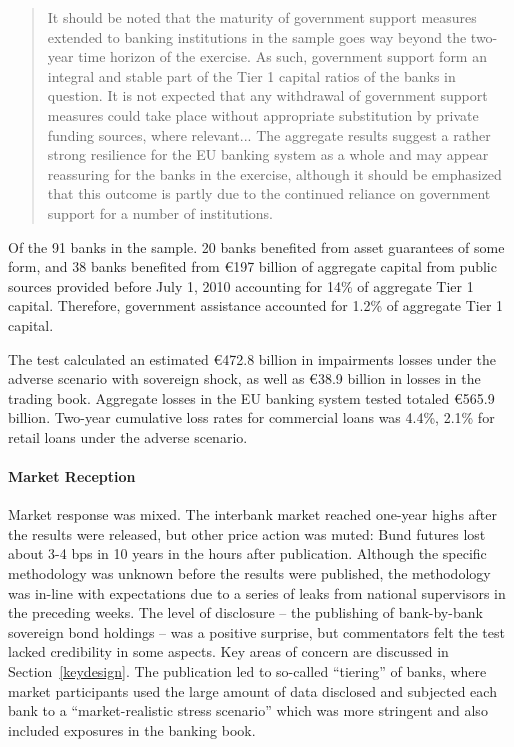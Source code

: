 \documentclass[12pt]{article}
\begin{document}
\begin{quote}
It should be noted that the maturity of government support measures extended to banking institutions in the sample goes way beyond the two-year time horizon of the exercise. As such, government support form an integral and stable part of the Tier 1 capital ratios of the banks in question. It is not expected that any withdrawal of government support measures could take place without appropriate substitution by private funding sources, where relevant... The aggregate results suggest a rather strong resilience for the EU banking
system as a whole and may appear reassuring for the banks in the exercise,
although it should be emphasized that this outcome is partly due to the
continued reliance on government support for a number of institutions.
\end{quote}

Of the 91 banks in the sample. 20 banks benefited from asset guarantees of some form, and 38 banks benefited from \euro{197} billion of aggregate capital from public sources provided before July 1, 2010 accounting for 14\% of aggregate Tier 1 capital. Therefore, government assistance accounted for 1.2\% of aggregate Tier 1 capital.

The test calculated an estimated \euro{472.8} billion in impairments losses under the adverse scenario with sovereign shock, as well as \euro{38.9} billion in losses in the trading book. Aggregate losses in the EU banking system tested totaled \euro{565.9} billion. Two-year cumulative loss rates for commercial loans was 4.4\%, 2.1\% for retail loans under the adverse scenario.

\paragraph{Market Reception} Market response was mixed. The interbank market reached one-year highs after the results were released, but other price action was muted: Bund futures lost about 3-4 bps in 10 years in the hours after publication. Although the specific methodology was unknown before the results were published, the methodology was in-line with expectations due to a series of leaks from national supervisors in the preceding weeks. The level of disclosure -- the publishing of bank-by-bank sovereign bond holdings -- was a positive surprise, but commentators felt the test lacked credibility in some aspects. Key areas of concern are discussed in Section~\ref{keydesign}. The publication led to so-called ``tiering'' of banks, where market participants used the large amount of data disclosed and subjected each bank to a ``market-realistic stress scenario'' which was more stringent and also included exposures in the banking book. \citep{Nedialkov}
\end{document}
